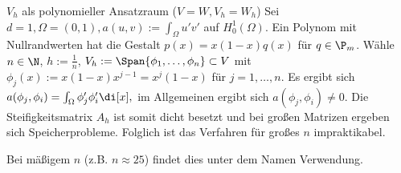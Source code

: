 \begin{ex} \label{3.52}
	$V_h$ als polynomieller Ansatzraum ($V = W, V_h = W_h$)
	Sei $d = 1, \Omega = (0,1), a(u,v) := \int_\Omega u' v'$ auf $H_0^1(\Omega)$.
	Ein Polynom mit Nullrandwerten hat die Gestalt $p(x) = x(1-x)q(x)$ für $q \in \P_m$.
	Wähle $n \in \N$, $h := \frac{1}{n}$, $V_h := \Span{\phi_1, \dotsc, \phi_n} \subset V$ mit $\phi_j(x) := x(1-x) x^{j-1} = x^j (1-x)$ für $j = 1, \dotsc, n$.
	Es ergibt sich
	\begin{math}
		a(\phi_j, \phi_i)
		= \int_\Omega \phi_j' \phi_i' \di[x],
	\end{math}
	im Allgemeinen ergibt sich $a(\phi_j, \phi_i) \neq 0$.
	Die Steifigkeitsmatrix $A_h$ ist somit dicht besetzt und bei großen Matrizen ergeben sich Speicherprobleme.
	Folglich ist das Verfahren für großes $n$ impraktikabel.

	Bei mäßigem $n$ (z.B. $n \approx 25$) findet dies unter dem Namen  Verwendung.
\end{ex}

